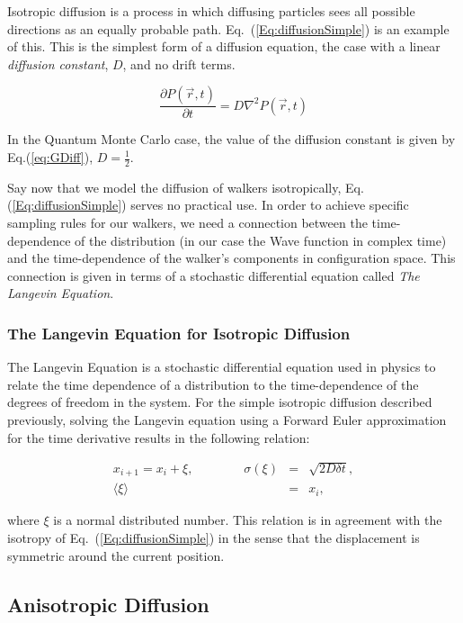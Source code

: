 Isotropic diffusion is a process in which diffusing particles sees all possible directions as an equally probable path. Eq.~(\ref{Eq:diffusionSimple}) is an example of this. This is the simplest form of a diffusion equation, the case with a linear \textit{diffusion constant}, $D$, and no drift terms.

\begin{equation}
 \frac{\partial P(\vec r, t)}{\partial t} = D\nabla^2 P(\vec r, t) 
 \label{Eq:diffusionSimple}
\end{equation}

In the Quantum Monte Carlo case, the value of the diffusion constant is given by Eq.(\ref{eq:GDiff}), $D=\frac{1}{2}$. 

Say now that we model the diffusion of walkers isotropically, Eq.(\ref{Eq:diffusionSimple}) serves no practical use. In order to achieve specific sampling rules for our walkers, we need a connection between the time-dependence of the distribution (in our case the Wave function in complex time) and the time-dependence of the walker's components in configuration space. This connection is given in terms of a stochastic differential equation called \textit{The Langevin Equation}.

\subsubsection{The Langevin Equation for Isotropic Diffusion}

The Langevin Equation is a stochastic differential equation used in physics to relate the time dependence of a distribution to the time-dependence of the degrees of freedom in the system. For the simple isotropic diffusion described previously, solving the Langevin equation using a Forward Euler approximation for the time derivative results in the following relation:

\begin{eqnarray}
 x_{i+1} = x_i + \xi, \qquad\qquad \sigma(\xi) &=& \sqrt{2D\delta t}, \\
			     \langle\xi\rangle &=& x_i, \nonumber 
\label{eq:langevinSolSimple}
\end{eqnarray}

where $\xi$ is a normal distributed number. This relation is in agreement with the isotropy of Eq.~(\ref{Eq:diffusionSimple}) in the sense that the displacement is symmetric around the current position.


\subsection{Anisotropic Diffusion}

